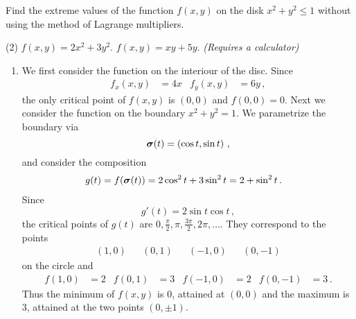 \begin{question}
Find the extreme values of the function $f(x,y)$ on the disk $x^2 + y^2 \leq 1$ without using the method of Lagrange multipliers.
\begin{tasks}(2)
\task
$f(x,y) = 2x^2 + 3y^2$.
\task
$f(x,y) = xy + 5y$.
{\itshape (Requires a calculator)}
\end{tasks}
\end{question}

\begin{solution}
\begin{enumerate}
\item
We first consider the function on the interiour of the disc. Since
\begin{align*}
f_x(x,y) &= 4x &
f_y(x,y) &= 6y\,,
\end{align*}
the only critical point of $f(x,y)$ is $(0,0)$ and $f(0,0) = 0$. Next we consider the function on the boundary $x^2+y^2 = 1$. We parametrize the boundary via
\[
\bm{\mathrm{\sigma}}(t) = \left( \cos t, \sin t \right)\,,
\]
and consider the composition
\begin{align*}
g(t) &= f(\bm{\mathrm{\sigma}}(t))
= 2\cos^2 t + 3\sin^2 t
= 2 + \sin^2 t\,.
\end{align*}
Since
\[
g'(t) = 2\sin t \cos t\,,
\]
the critical points of $g(t)$ are $0, \displaystyle \frac \pi 2, \pi, \frac{3\pi}2, 2\pi, \dots$. They correspond to the points
\begin{align*}
(1,0) && (0,1) && (-1,0) && (0,-1)
\end{align*}
on the circle and
\begin{align*}
f(1,0) &= 2 &
f(0,1) &= 3 &
f(-1,0) &= 2 &
f(0,-1) &= 3\,.
\end{align*}
Thus the minimum of $f(x,y)$ is $0$, attained at $(0,0)$ and the maximum is $3$, attained at the two points $(0,\pm 1)$.


\end{enumerate}
\end{solution}
